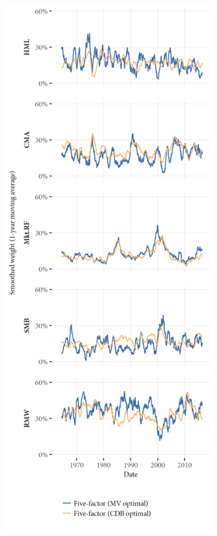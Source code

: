 \begin{figure}[p]
  \centering
  \footnotesize
  \begin{subfigure}{0.45\textwidth}
    \includegraphics[width=\textwidth]{graphics/weights/compare_Weights_CDB_MV_5F.png}

\end{subfigure}
\end{figure}
